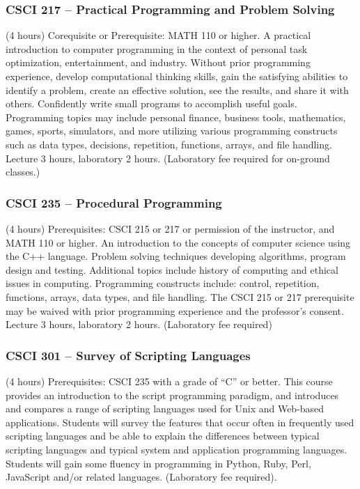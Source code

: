 \subsubsection{CSCI 217 -- Practical Programming and Problem Solving}%
\label{course:CSCI:217}
(4 hours) Corequisite or Prerequisite: MATH 110 or higher. A practical introduction to computer programming in the context of personal task optimization, entertainment, and industry. Without prior programming experience, develop computational thinking skills, gain the satisfying abilities to identify a problem, create an effective solution, see the results, and share it with others. Confidently write small programs to accomplish useful goals. Programming topics may include personal finance, business tools, mathematics, games, sports, simulators, and more utilizing various programming constructs such as data types, decisions, repetition, functions, arrays, and file handling. Lecture 3 hours, laboratory 2 hours. (Laboratory fee required for on-ground classes.)

\subsubsection{CSCI 235 -- Procedural Programming}%
\label{course:CSCI:235}
(4 hours) Prerequisites: CSCI 215 or 217 or permission of the instructor, and MATH 110 or higher. An introduction to the concepts of computer science using the C++ language. Problem solving techniques developing algorithms, program design and testing. Additional topics include history of computing and ethical issues in computing. Programming constructs include: control, repetition, functions, arrays, data types, and file handling. The CSCI 215 or 217 prerequisite may be waived with prior programming experience and the professor’s consent. Lecture 3 hours, laboratory 2 hours. (Laboratory fee required)

\subsubsection{CSCI 301 -- Survey of Scripting Languages}%
\label{course:CSCI:301}
(4 hours) Prerequisites: CSCI 235 with a grade of “C” or better. This course provides an introduction to the script programming paradigm, and introduces and compares a range of scripting languages used for Unix and Web-based applications. Students will survey the features that occur often in frequently used scripting languages and be able to explain the differences between typical scripting languages and typical system and application programming languages. Students will gain some fluency in programming in Python, Ruby, Perl, JavaScript and/or related languages. (Laboratory fee required).

